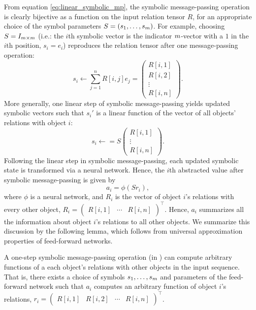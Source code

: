 From equation \eqref{eq:linear_symbolic_mp}, the symbolic message-passing operation is clearly bijective as a function on the input relation tensor \(R\), for an appropriate choice of the symbol parameters \(S = (s_1,\ldots, s_m)\). For example, choosing \(S = I_{m \times m}\) (i.e.: the \(i\)th symbolic vector is the indicator \(m\)-vector with a \(1\) in the \(i\)th position, \(s_i = e_i\)) reproduces the relation tensor after one message-passing operation:
\begin{equation*}
	s_i  \leftarrow  \sum_{j=1}^{n} R[i,j] e_j = \begin{pmatrix}R[i,1] \\ R[i,2] \\ \vdots \\ R[i,n]\end{pmatrix}.
\end{equation*}
More generally, one linear step of symbolic message-passing yields updated symbolic vectors such that \(s_i'\) is a linear function of the vector of all objects' relations with object \(i\):
\begin{equation*}
	s_i \leftarrow = S \begin{pmatrix}R[i,1] \\ \vdots \\ R[i,n]\end{pmatrix}.
\end{equation*}
Following the linear step in symbolic message-passing, each updated symbolic state is transformed via a neural network. Hence, the \(i\)th abstracted value after symbolic message-passing is given by
\begin{equation*}
	a_i = \phi\left(S r_i \right),
\end{equation*}
where \(\phi\) is a neural network, and \(R_i\) is the vector of object \(i\)'s relations with every other object, \(R_i = \begin{pmatrix}R[i,1] & \cdots & R[i,n]\end{pmatrix}^\top\). Hence, \(a_i\) summarizes all the information about object \(i\)'s relations to all other objects. We summarize this discussion by the following
lemma, which follows from universal approximation properties of feed-forward networks.

\begin{lemma}
	\label{lemma:function_class_1_step_symbolic_mp}
	A one-step symbolic message-passing operation (in ) can compute arbitrary functions of a each object's relations with other objects in the input sequence. That is, there exists a choice of symbols \(s_1, \ldots, s _m\) and parameters of the feed-forward network such that \(a_i\) computes an arbitrary function of object \(i\)'s relations, \(r_i = \begin{pmatrix}R[i,1] & R[i,2] & \cdots & R[i,n]\end{pmatrix}^\top\).
\end{lemma}


